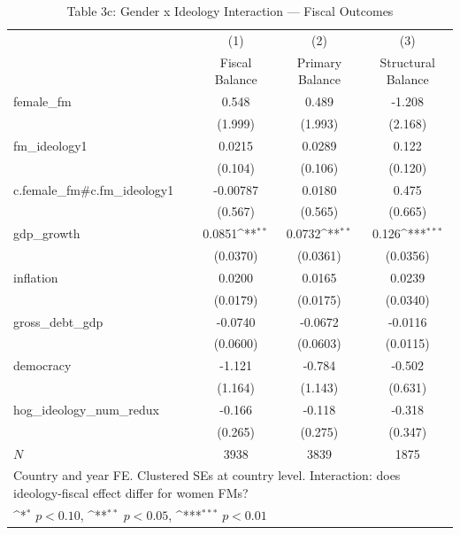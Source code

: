 \begin{table}[htbp]\centering
\def\sym#1{\ifmmode^{#1}\else\(^{#1}\)\fi}
\caption{Table 3c: Gender x Ideology Interaction — Fiscal Outcomes}
\begin{tabular}{l*{3}{c}}
\hline\hline
            &\multicolumn{1}{c}{(1)}&\multicolumn{1}{c}{(2)}&\multicolumn{1}{c}{(3)}\\
            &\multicolumn{1}{c}{Fiscal Balance}&\multicolumn{1}{c}{Primary Balance}&\multicolumn{1}{c}{Structural Balance}\\
\hline
female\_fm   &       0.548         &       0.489         &      -1.208         \\
            &     (1.999)         &     (1.993)         &     (2.168)         \\
[1em]
fm\_ideology1&      0.0215         &      0.0289         &       0.122         \\
            &     (0.104)         &     (0.106)         &     (0.120)         \\
[1em]
c.female\_fm\#c.fm\_ideology1&    -0.00787         &      0.0180         &       0.475         \\
            &     (0.567)         &     (0.565)         &     (0.665)         \\
[1em]
gdp\_growth  &      0.0851\sym{**} &      0.0732\sym{**} &       0.126\sym{***}\\
            &    (0.0370)         &    (0.0361)         &    (0.0356)         \\
[1em]
inflation   &      0.0200         &      0.0165         &      0.0239         \\
            &    (0.0179)         &    (0.0175)         &    (0.0340)         \\
[1em]
gross\_debt\_gdp&     -0.0740         &     -0.0672         &     -0.0116         \\
            &    (0.0600)         &    (0.0603)         &    (0.0115)         \\
[1em]
democracy   &      -1.121         &      -0.784         &      -0.502         \\
            &     (1.164)         &     (1.143)         &     (0.631)         \\
[1em]
hog\_ideology\_num\_redux&      -0.166         &      -0.118         &      -0.318         \\
            &     (0.265)         &     (0.275)         &     (0.347)         \\
\hline
\(N\)       &        3938         &        3839         &        1875         \\
\hline\hline
\multicolumn{4}{l}{\footnotesize Country and year FE. Clustered SEs at country level.  Interaction: does ideology-fiscal effect differ for women FMs?}\\
\multicolumn{4}{l}{\footnotesize \sym{*} \(p<0.10\), \sym{**} \(p<0.05\), \sym{***} \(p<0.01\)}\\
\end{tabular}
\end{table}
